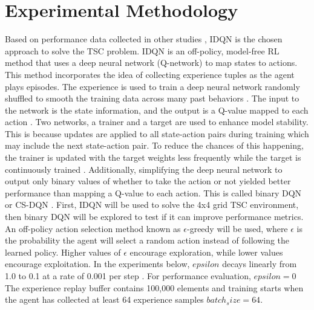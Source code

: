 \documentclass[letterpaper]{article} %
\begin{document}
\section{Experimental Methodology}
Based on performance data collected in other studies \cite{ault2021reinforcement} \cite{Ghanadbashi2023}, IDQN is the chosen approach to solve the TSC problem.
IDQN is an off-policy, model-free RL method that uses a deep neural network (Q-network) to map states to actions.
This method incorporates the idea of collecting experience tuples as the agent plays episodes.
The experience is used to train a deep neural network randomly shuffled to smooth the training data across many past behaviors \cite{DBLP:journals/corr/MnihKSGAWR13}.
The input to the network is the state information, and the output is a Q-value mapped to each action \cite{DeAsis2017MultiStepRL}.
Two networks, a trainer and a target are used to enhance model stability. This is because updates are applied to all state-action pairs during training which may include the next state-action pair.
To reduce the chances of this happening, the trainer is updated with the target weights less frequently while the target is continuously trained \cite{Fan2019TheoreticalDQ}.
Additionally, simplifying the deep neural network to output only binary values of whether to take the action or not yielded better performance than mapping a Q-value to each action. This is called binary DQN or CS-DQN \cite{hafiz2020deep}.
First, IDQN will be used to solve the 4x4 grid TSC environment, then binary DQN will be explored to test if it can improve performance metrics.
An off-policy action selection method known as $\epsilon$-greedy will be used, where $\epsilon$ is the probability the agent will select a random action instead of following the learned policy.
Higher values of $\epsilon$ encourage exploration, while lower values encourage exploitation.
In the experiments below, $epsilon$ decays linearly from 1.0 to 0.1 at a rate of 0.001 per step \cite{Mnih2015}. For performance evaluation, $epsilon = 0$
The experience replay buffer contains 100,000 elements and training starts when the agent has collected at least 64 experience samples \(batch_size = 64\).
\end{document}
